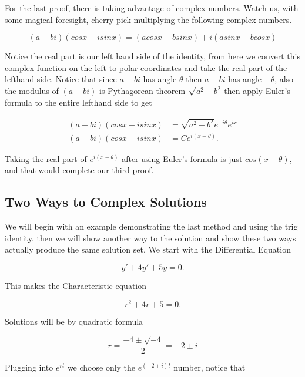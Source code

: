 \documentclass[12pt]{article}
\begin{document}
For the last proof, there is taking advantage of complex numbers. Watch us, with some magical foresight, cherry pick multiplying the following complex numbers.

\begin{equation*}
   (a-bi)(cosx+isinx) = (acosx+bsinx)+i(asinx-bcosx) 
\end{equation*}

Notice the real part is our left hand side of the identity, from here we convert this complex function on the left to polar coordinates and take the real part of the lefthand side. Notice that since $a+bi$ has angle $\theta$ then $a-bi$ has angle $-\theta$, also the modulus of $(a-bi)$ is Pythagorean theorem $\sqrt{a^2+b^2}$ then apply Euler's formula to the entire lefthand side to get

\begin{align*}
   (a-bi)(cosx+isinx) &= \sqrt{a^2+b^2} e^{-i\theta} e^{ix} \\
   (a-bi)(cosx+isinx) &= C e^{i(x-\theta)}.
\end{align*}

Taking the real part of $e^{i(x-\theta)}$ after using Euler's formula is just $cos(x-\theta)$, and that would complete our third proof.

\subsection{Two Ways to Complex Solutions} 
We will begin with an example demonstrating the last method and using the trig identity, then we will show another way to the solution and show these two ways actually produce the same solution set. We start with the Differential Equation

\begin{equation*}
    y'+4y'+5y=0.
\end{equation*}

This makes the Characteristic equation

\begin{equation*}
    r^2+4r+5=0.
\end{equation*}

Solutions will be by quadratic formula

\begin{equation*}
    r = \frac{-4 \pm \sqrt{-4}}{2} = -2 \pm i
\end{equation*}

Plugging into $e^{rt}$ we choose only the $e^{(-2+i)t}$ number, notice that
\end{document}
